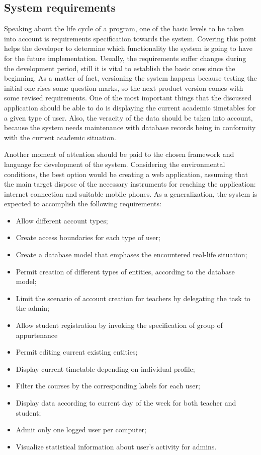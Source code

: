 \subsection{System requirements}
Speaking about the life cycle of a program, one of the basic levels to be taken into account is requirements specification towards the system. Covering this point helps the developer to determine which functionality the system is going to have for the future implementation. Usually, the requirements suffer changes during the development period, still it is vital to establish the basic ones since the beginning. As a matter of fact, versioning the system happens because testing the initial one rises some question marks, so the next product version comes with some revised requirements. One of the most important things that the discussed application should be able to do  is displaying the current academic timetables for a given type of user. Also, the veracity of the data should be taken into account, because the system needs maintenance with database records being in conformity with the current academic situation. 

Another moment of attention should be paid to the chosen framework and language for development of the system. Considering the environmental conditions, the best option would be creating a web application, assuming that the main target dispose of the necessary instruments for reaching the application: internet connection and suitable mobile phones. As a generalization, the system is expected to accomplish the following requirements:
\begin{itemize}
\item Allow different account types;
\item Create access boundaries for each type of user;
\item Create a database model that emphases the encountered real-life situation;
\item Permit creation of different types of entities, according to the database model;
\item Limit the scenario of account creation for teachers by delegating the task to the admin;
\item Allow student registration by invoking the specification of group of appurtenance
\item Permit editing current existing entities;
\item Display current timetable depending on individual profile;
\item Filter the courses by the corresponding labels for each user;
\item Display data according to current day of the week for both teacher and student;
\item Admit only one logged user per computer;
\item Visualize statistical information about user's activity for admins.
\end{itemize}

